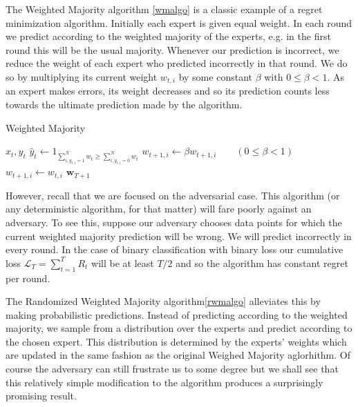 \documentclass{article}
\begin{document}
The Weighted Majority algorithm \autoref{wmalgo} \cite{littlestone1994weighted} is a classic example of a regret minimization algorithm. Initially each expert is given equal weight. In each round we predict according to the weighted majority of the experts, e.g. in the first round this will be the usual majority. Whenever our prediction is incorrect, we reduce the weight of each expert who predicted incorrectly in that round. We do so by multiplying its current weight $w_{t,i}$ by some constant $\beta$ with $0 \le \beta < 1$. As an expert makes errors, its weight decreases and so its prediction counts less towards the ultimate prediction made by the algorithm.

\begin{algorithm}[H]
\caption{Weighted Majority}
\label{wmalgo}
\begin{algorithmic}[1]
\EndFor
{}
    \State {} $x_t , y_t$
    \State $\hat y_t \leftarrow 1_{\sum_{i, y_{t,i}=1}^N w_t \ge \sum_{i, y_{t,i}=0}^N w_t}$
                \State $w_{t+1,i} \leftarrow \beta w_{t+1,i} \quad\quad(0 \le \beta < 1)$
            \Else
                \State $w_{t+1,i} \leftarrow w_{t,i}$
            \EndIf
        \EndFor
    \EndIf
\EndFor
\State \Return $\textbf{w}_{T+1}$
\end{algorithmic}
\end{algorithm}

However, recall that we are focused on the adversarial case. This algorithm (or any deterministic algorithm, for that matter) will fare poorly against an adversary. To see this, suppose our adversary chooses data points for which the current weighted majority prediction will be wrong. We will predict incorrectly in every round. In the case of binary classification with binary loss our cumulative loss $\mathcal{L}_T = \sum_{t=1}^T R_t$ will be at least $T/2$ and so the algorithm has constant regret per round.

The Randomized Weighted Majority algorithm\autoref{rwmalgo} alleviates this by making probabilistic predictions. Instead of predicting according to the weighted majority, we sample from a distribution over the experts and predict according to the chosen expert. This distribution is determined by the experts' weights which are updated in the same fashion as the original Weighed Majority aglorhithm. Of course the adversary can still frustrate us to some degree but we shall see that this relatively simple modification to the algorithm produces a surprisingly promising result.
\end{document}
